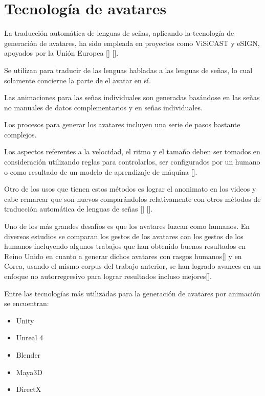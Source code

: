 \section{Tecnología de avatares}\label{section:state-of-the-art:avatars}


La traducción automática de lenguas de señas, aplicando la tecnología de generación de avatares, ha sido empleada en proyectos como ViSiCAST  y eSIGN, apoyados por la Unión Europea [\cite{visicast_at_uea_2021}] [\cite{esign_at_uea_2021}]. 

Se utilizan para traducir de las lenguas habladas a las lenguas de señas, lo cual solamente concierne la parte de el avatar en sí.

Las animaciones para las señas individuales son generadas basándose
en las señas no manuales de datos complementarios y en señas individuales. 

Los procesos para generar los avatares incluyen una serie de pasos bastante complejos.
 
Los aspectos referentes a la velocidad, el ritmo y el tamaño deben ser tomados en
consideración utilizando reglas para controlarlos, ser configurados por un humano o
como resultado de un modelo de aprendizaje de máquina [\cite{nguyen2021automatic}].

Otro de los usos que tienen estos métodos es lograr el anonimato en los videos y cabe remarcar que  son nuevos comparándolos relativamente con otros métodos de traducción automática de lenguas de señas [\cite{kang2010effect}] [\cite{saragih2011real}].

Uno de los más grandes desafíos es que los avatares luzcan como humanos. En diversos estudios se comparan los gestos de los avatares con los gestos de los
humanos incluyendo algunos trabajos que han obtenido buenos resultados en Reino Unido en cuanto a generar dichos avatares con rasgos humanos[\cite{stoll2018sign}] y  en Corea, usando el mismo corpus del trabajo anterior, se han logrado avances en un enfoque no autorregresivo para lograr resultados incluso mejores[\cite{hwang2021non}].

 Entre las tecnologías más utilizadas para la generación de avatares por animación se encuentran:
 \begin{itemize}
 \item  Unity
 \item Unreal 4
 \item Blender
 \item Maya3D 
 \item DirectX
 \end{itemize}  
 
